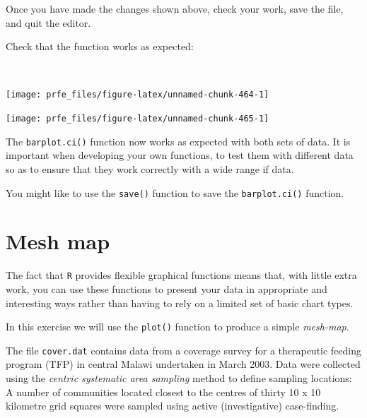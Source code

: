 \documentclass[12pt,a4paper]{book}
\newenvironment{Shaded}{\begin{snugshade}}{\end{snugshade}}
\newcommand{\KeywordTok}[1]{\textcolor[rgb]{0.13,0.29,0.53}{\textbf{#1}}}
\newcommand{\NormalTok}[1]{#1}
\newcommand{\OperatorTok}[1]{\textcolor[rgb]{0.81,0.36,0.00}{\textbf{#1}}}
\theoremstyle{definition}
\theoremstyle{definition}
\theoremstyle{definition}
\theoremstyle{remark}
\begin{document}
\newpage

Once you have made the changes shown above, check your work, save the
file, and quit the editor.

Check that the function works as expected:

~

\begin{Shaded}
\end{Shaded}

\begin{center}\texttt{[image: prfe\_files/figure-latex/unnamed-chunk-464-1]} \end{center}

\begin{center}\texttt{[image: prfe\_files/figure-latex/unnamed-chunk-465-1]} \end{center}

\newpage

The \texttt{barplot.ci()} function now works as expected with both sets
of data. It is important when developing your own functions, to test
them with different data so as to ensure that they work correctly with a
wide range if data.

You might like to use the \texttt{save()} function to save the
\texttt{barplot.ci()} function.

\hypertarget{mesh-map}{%
\section{Mesh map}\label{mesh-map}}

The fact that \texttt{R} provides flexible graphical functions means
that, with little extra work, you can use these functions to present
your data in appropriate and interesting ways rather than having to rely
on a limited set of basic chart types.

In this exercise we will use the \texttt{plot()} function to produce a
simple \emph{mesh-map}.

The file \texttt{cover.dat} contains data from a coverage survey for a
therapeutic feeding program (TFP) in central Malawi undertaken in March
2003. Data were collected using the \emph{centric systematic area
sampling} method to define sampling locations: A number of communities
located closest to the centres of thirty 10 x 10 kilometre grid squares
were sampled using active (investigative) case-finding.
\end{document}

